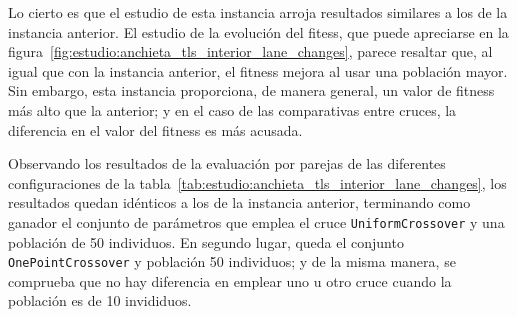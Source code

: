 Lo cierto es que el estudio de esta instancia arroja resultados similares a los de la instancia anterior. El estudio de la evolución del fitess, que puede apreciarse en la figura~\ref{fig:estudio:anchieta_tls_interior_lane_changes}, parece resaltar que, al igual que con la instancia anterior, el fitness mejora al usar una población mayor. Sin embargo, esta instancia proporciona, de manera general, un valor de fitness más alto que la anterior; y en el caso de las comparativas entre cruces, la diferencia en el valor del fitness es más acusada.

Observando los resultados de la evaluación por parejas de las diferentes configuraciones de la tabla~\ref{tab:estudio:anchieta_tls_interior_lane_changes}, los resultados quedan idénticos a los de la instancia anterior, terminando como ganador el conjunto de parámetros que emplea el cruce \texttt{UniformCrossover} y una población de 50 individuos. En segundo lugar, queda el conjunto \texttt{OnePointCrossover} y población 50 individuos; y de la misma manera, se comprueba que no hay diferencia en emplear uno u otro cruce cuando la población es de 10 invididuos.

